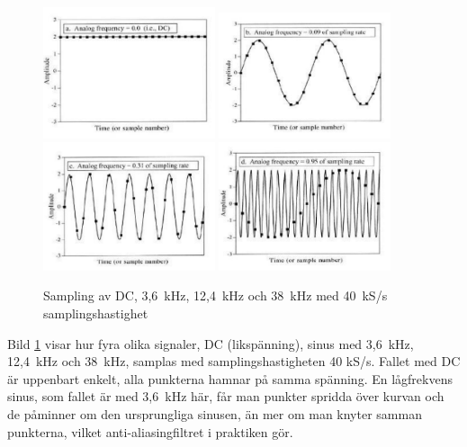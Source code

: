 \begin{figure}
\begin{center}
\includegraphics[width=0.45\textwidth]{images/cropped_pdfs/bild_2_1-38.pdf}
\includegraphics[width=0.45\textwidth]{images/cropped_pdfs/bild_2_1-39.pdf}
\includegraphics[width=0.45\textwidth]{images/cropped_pdfs/bild_2_1-40.pdf}
\includegraphics[width=0.45\textwidth]{images/cropped_pdfs/bild_2_1-41.pdf}
\caption{Sampling av DC, 3,6~kHz, 12,4~kHz och 38~kHz med 40~kS/s samplingshastighet}
\label{fig:BildII1-38}
\end{center}
\end{figure}

Bild \ref{fig:BildII1-38} visar hur fyra olika signaler, DC (likspänning), 
sinus med
3,6~kHz, 12,4~kHz och 38~kHz, samplas med samplingshastigheten 40 kS/s.
Fallet med DC är uppenbart enkelt, alla punkterna hamnar på samma spänning.
En lågfrekvens sinus, som fallet är med 3,6~kHz här, får man punkter spridda
över kurvan och de påminner om den ursprungliga sinusen, än mer om man knyter
samman punkterna, vilket anti-aliasingfiltret i praktiken gör.


